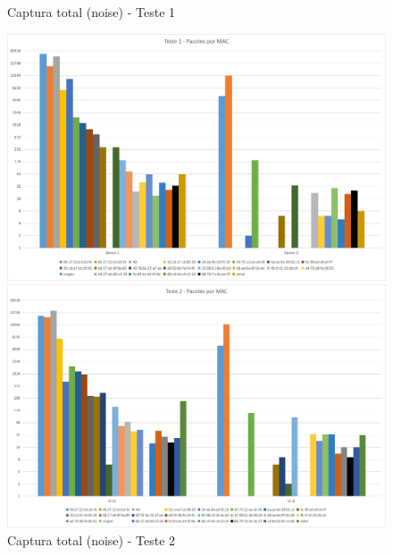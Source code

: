 \begin{figure}[htb]
	\label{mg4-noise}
	\centering
	\begin{minipage}{0.49\textwidth}
	\centering
		\caption{\label{fig-mg4-noise-t1}Captura total (noise) - Teste 1}
		\includegraphics[width=1\textwidth]{060-testes/data-analisis/distance-mg4plus-netflix/Teste1.png}
	\end{minipage}
	\hfill
	\begin{minipage}{0.49\textwidth}
	\centering
		\caption{\label{fig-mg4-noise-t2}Captura total (noise) - Teste 2}
		\includegraphics[width=1\textwidth]{060-testes/data-analisis/distance-mg4plus-netflix/Teste2.png}
	\end{minipage}
\end{figure}


